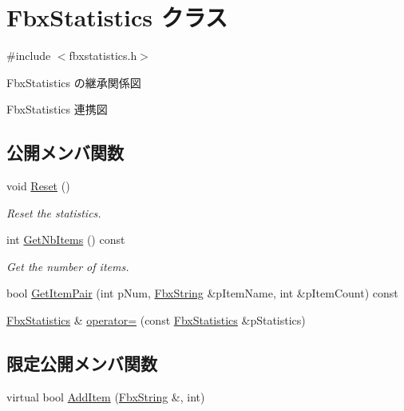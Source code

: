 \hypertarget{class_fbx_statistics}{}\section{Fbx\+Statistics クラス}
\label{class_fbx_statistics}


{\ttfamily \#include $<$fbxstatistics.\+h$>$}



Fbx\+Statistics の継承関係図


Fbx\+Statistics 連携図
\subsection*{公開メンバ関数}
\begin{DoxyCompactItemize}
\item 
void \hyperlink{class_fbx_statistics_ad0cf2f0dafc61cb5c99b8ad63d86f0c7}{Reset} ()
\begin{DoxyCompactList}\small\item\em Reset the statistics. \end{DoxyCompactList}\item 
int \hyperlink{class_fbx_statistics_a6e2b88a54e55a02e714707366fc44cd5}{Get\+Nb\+Items} () const
\begin{DoxyCompactList}\small\item\em Get the number of items. \end{DoxyCompactList}\item 
bool \hyperlink{class_fbx_statistics_a20877448d6ff61b050ea6d94554fa719}{Get\+Item\+Pair} (int p\+Num, \hyperlink{class_fbx_string}{Fbx\+String} \&p\+Item\+Name, int \&p\+Item\+Count) const
\item 
\hyperlink{class_fbx_statistics}{Fbx\+Statistics} \& \hyperlink{class_fbx_statistics_a176871e5e6bf03a71a2ae7f4dd277403}{operator=} (const \hyperlink{class_fbx_statistics}{Fbx\+Statistics} \&p\+Statistics)
\end{DoxyCompactItemize}
\subsection*{限定公開メンバ関数}
\begin{DoxyCompactItemize}
\item 
virtual bool \hyperlink{class_fbx_statistics_abd81e5b31d33546ad6ba5fa9af34c792}{Add\+Item} (\hyperlink{class_fbx_string}{Fbx\+String} \&, int)
\end{DoxyCompactItemize}
